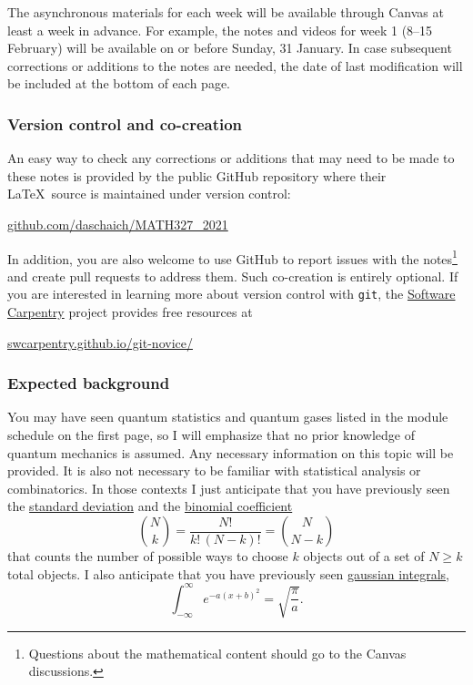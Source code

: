 The asynchronous materials for each week will be available through Canvas at least a week in advance.
For example, the notes and videos for week 1 (8--15 February) will be available on or before Sunday, 31 January.
In case subsequent corrections or additions to the notes are needed, the date of last modification will be included at the bottom of each page.

\subsubsection*{Version control and co-creation}
An easy way to check any corrections or additions that may need to be made to these notes is provided by the public GitHub repository where their \LaTeX\ source is maintained under version control: \\
\centerline{\href{https://github.com/daschaich/MATH327_2021}{github.com/daschaich/MATH327\_2021}}
In addition, you are also welcome to use GitHub to report issues with the notes\footnote{Questions about the mathematical content should go to the Canvas discussions.} and create pull requests to address them.
Such co-creation is entirely optional.
If you are interested in learning more about version control with \texttt{git}, the \href{https://software-carpentry.org}{Software Carpentry} project provides free resources at \\
\centerline{\href{https://swcarpentry.github.io/git-novice/}{swcarpentry.github.io/git-novice/}}

\subsubsection*{Expected background}
You may have seen quantum statistics and quantum gases listed in the module schedule on the first page, so I will emphasize that no prior knowledge of quantum mechanics is assumed.
Any necessary information on this topic will be provided.
%
It is also not necessary to be familiar with statistical analysis or combinatorics.
In those contexts I just anticipate that you have previously seen the \href{https://en.wikipedia.org/wiki/Standard_deviation}{standard deviation} and the \href{https://en.wikipedia.org/wiki/Binomial_coefficient}{binomial coefficient}
\begin{equation*}
  \binom{N}{k} = \frac{N!}{k! \, (N - k)!} = \binom{N}{N - k}
\end{equation*}
that counts the number of possible ways to choose $k$ objects out of a set of $N \geq k$ total objects.
I also anticipate that you have previously seen \href{https://en.wikipedia.org/wiki/Gaussian_integral}{gaussian integrals},
\begin{equation*}
  \int_{-\infty}^{\infty} e^{-a (x + b)^2} = \sqrt{\frac{\pi}{a}}.
\end{equation*}



